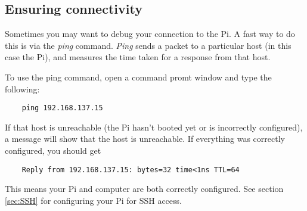 \subsection{Ensuring connectivity}
\label{sec:Connectivity-EnsuringConnectivity}
Sometimes you may want to debug your connection to the Pi. A fast way to do this is via the \textit{ping} command. \textit{Ping} sends a packet to a particular host (in this case the Pi), and measures the time taken for a response from that host. 

To use the ping command, open a command promt window and type the following:
\begin{verbatim}
    ping 192.168.137.15
\end{verbatim}

If that host is unreachable (the Pi hasn't booted yet or is incorrectly configured), a message will show that the host is unreachable. If everything was correctly configured, you should get
\begin{verbatim}
    Reply from 192.168.137.15: bytes=32 time<1ns TTL=64
\end{verbatim}

This means your Pi and computer are both correctly configured. See section \ref{sec:SSH} for configuring your Pi for SSH access.